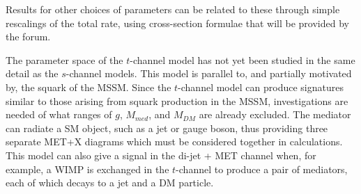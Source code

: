 \documentclass[a4,debug,notitlepage,nobib]{tufte-handout}
\begin{document}



Results for other choices of parameters can be related to
these through simple rescalings of the total rate, using cross-section
formulae that will be provided by the forum.

The parameter space of the $t$-channel model 
has not yet been studied in the same detail as the
$s$-channel models. 
This model is parallel to, and partially motivated by, the
squark of the MSSM. Since the $t$-channel model can produce signatures 
similar to those arising from squark production in the MSSM, investigations 
are needed of what ranges of $g$, $M_{med}$, and $M_{DM}$ are already excluded.
The mediator can radiate a SM object, such as a jet or gauge boson, 
thus providing three separate MET+X diagrams which must be considered together in
calculations. This model can also give a signal in the di-jet + MET
channel when, for example, a WIMP is exchanged in the $t$-channel to
produce a pair of mediators, each of which decays to a jet and a DM particle.

\end{document}
